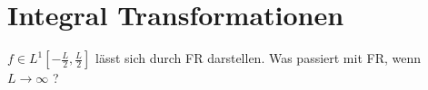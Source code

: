 \section{Integral Transformationen}
    $f \in L^1[-\frac{L}{2}, \frac{L}{2}]$ lässt sich durch
    FR darstellen. Was passiert mit FR, wenn 
    $L \rightarrow \infty$ ? 